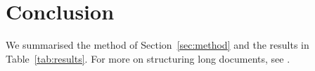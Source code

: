 \section{Conclusion}
\label{sec:conclusion}

We summarised the method of Section~\ref{sec:method} and the results in
Table~\ref{tab:results}. For more on structuring long documents, see
\cite{mittelbach2004companion}.
